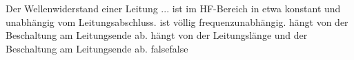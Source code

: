     {Der Wellenwiderstand einer Leitung ...}
    {ist im HF-Bereich in etwa konstant und unabhängig vom Leitungsabschluss.}
    {ist völlig frequenzunabhängig.}
    {hängt von der Beschaltung am Leitungsende ab.}
    {hängt von der Leitungslänge und der Beschaltung am Leitungsende ab.}
    {false}{false}